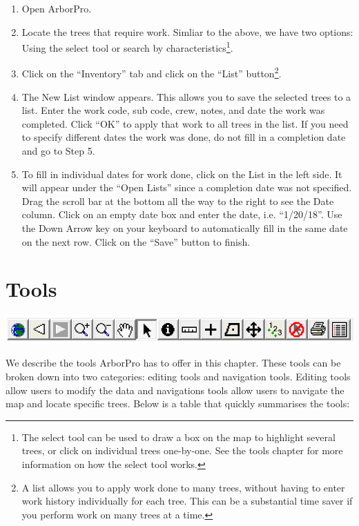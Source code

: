 \documentclass[]{book}
\providecommand{\tightlist}{%
  \setlength{\itemsep}{0pt}\setlength{\parskip}{0pt}}
\let\rmarkdownfootnote\footnote%
\def\footnote{\protect\rmarkdownfootnote}
\begin{document}
\begin{enumerate}
\def\labelenumi{\arabic{enumi}.}
\tightlist
\item
  Open ArborPro.
\item
  Locate the trees that require work. Simliar to the above, we have two
  options: Using the select tool or search by characteristics\footnote{The
    select tool can be used to draw a box on the map to highlight
    several trees, or click on individual trees one-by-one. See the
    tools chapter for more information on how the select tool works.}.
\item
  Click on the ``Inventory'' tab and click on the ``List''
  button\footnote{A list allows you to apply work done to many trees,
    without having to enter work history individually for each tree.
    This can be a substantial time saver if you perform work on many
    trees at a time.}.
\item
  The New List window appears. This allows you to save the selected
  trees to a list. Enter the work code, sub code, crew, notes, and date
  the work was completed. Click ``OK'' to apply that work to all trees
  in the list. If you need to specify different dates the work was done,
  do not fill in a completion date and go to Step 5.
\item
  To fill in individual dates for work done, click on the List in the
  left side. It will appear under the ``Open Lists'' since a completion
  date was not specified. Drag the scroll bar at the bottom all the way
  to the right to see the Date column. Click on an empty date box and
  enter the date, i.e. ``1/20/18''. Use the Down Arrow key on your
  keyboard to automatically fill in the same date on the next row. Click
  on the ``Save'' button to finish.
\end{enumerate}

\hypertarget{tools}{%
\chapter{Tools}\label{tools}}

\includegraphics[width=10.36in]{images/toolbar}

We describe the tools ArborPro has to offer in this chapter. These tools
can be broken down into two categories: editing tools and navigation
tools. Editing tools allow users to modify the data and navigations
tools allow users to navigate the map and locate specific trees. Below
is a table that quickly summarises the tools:
\end{document}
